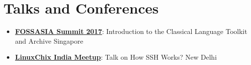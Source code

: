 \documentclass[letterpaper,11pt]{article}
\newcommand{\resumeItem}[2]{
  \item\small{
    \textbf{#1}{: #2 \vspace{-2pt}}
  }
}
\newcommand{\resumeSubItem}[2]{\resumeItem{#1}{#2}\vspace{-4pt}}
\newcommand{\resumeSubHeadingListStart}{\begin{itemize}[leftmargin=*]}
\newcommand{\resumeSubHeadingListEnd}{\end{itemize}}
\begin{document}
\section{Talks and Conferences}
 \resumeSubHeadingListStart
    \resumeSubItem{\href{https://2017.fossasia.org/tracks.html\#2891}{FOSSASIA Summit 2017}}{Introduction to the Classical Language Toolkit and Archive}\hfill{Singapore}
    \resumeSubItem{\href{https://www.meetup.com/en-AU/LinuxChix-India-Meetup/events/242031500/}{LinuxChix India Meetup}}
       {Talk on How SSH Works?}\hfill{New Delhi}
 \resumeSubHeadingListEnd
\end{document}
